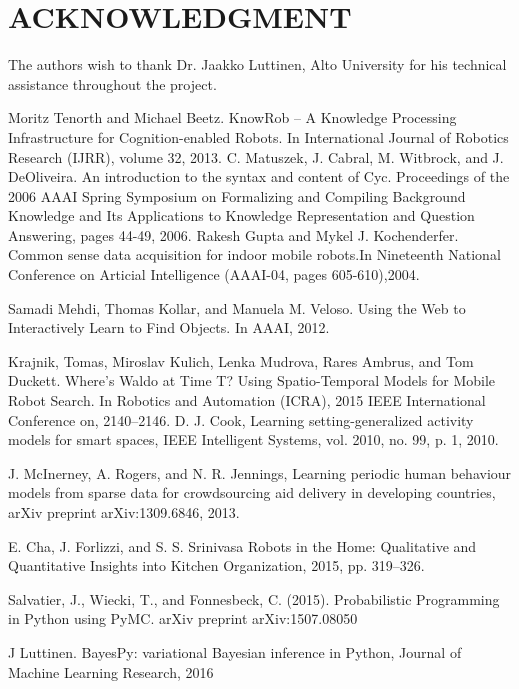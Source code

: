 \documentclass[a4paper, 10pt, conference]{ieeeconf}      %
\begin{document}

\section*{ACKNOWLEDGMENT}
The authors wish to thank Dr. Jaakko Luttinen, Alto University for his technical assistance throughout the project.




\begin{thebibliography}{99}

 Moritz Tenorth and Michael Beetz. KnowRob -- A Knowledge Processing Infrastructure for Cognition-enabled Robots. In International Journal of Robotics Research (IJRR), volume 32, 2013. 
  C.  Matuszek,  J.  Cabral,  M.  Witbrock,  and  J.  DeOliveira.   An introduction  to  the  syntax  and  content  of  Cyc. Proceedings  of the  2006  AAAI  Spring  Symposium  on  Formalizing  and  Compiling  Background  Knowledge  and  Its  Applications  to  Knowledge Representation and Question Answering, pages 44-49, 2006. 
  Rakesh Gupta and Mykel J. Kochenderfer.  Common sense data acquisition  for  indoor  mobile  robots.In Nineteenth  National Conference  on  Articial  Intelligence  (AAAI-04,  pages  605-610),2004.

 Samadi Mehdi, Thomas Kollar, and Manuela M. Veloso. Using the Web to Interactively Learn to Find Objects. In AAAI, 2012. 

 Krajnik, Tomas, Miroslav Kulich, Lenka Mudrova, Rares Ambrus, and Tom Duckett. Where’s Waldo at Time T? Using Spatio-Temporal Models for Mobile Robot Search. In Robotics and Automation (ICRA), 2015 IEEE International Conference on, 2140–2146.
 D.  J.  Cook,  Learning  setting-generalized  activity  models  for  smart spaces, IEEE Intelligent Systems, vol. 2010, no. 99, p. 1, 2010.

 J. McInerney, A. Rogers, and N. R. Jennings, Learning periodic human behaviour models from sparse data for crowdsourcing aid delivery in developing countries, arXiv preprint arXiv:1309.6846, 2013.

 E. Cha, J. Forlizzi, and S. S. Srinivasa Robots in the Home: Qualitative and Quantitative Insights into Kitchen Organization, 2015, pp. 319–326.

 Salvatier, J., Wiecki, T., and Fonnesbeck, C. (2015). Probabilistic Programming in Python using PyMC. arXiv preprint arXiv:1507.08050

 J Luttinen. BayesPy: variational Bayesian inference in Python, Journal of Machine Learning Research, 2016







\end{thebibliography}
\end{document}
